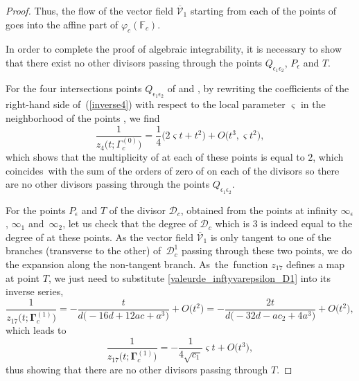 \documentclass[pdftex]{sigma}
\numberwithin{equation}{section}
\begin{document}
\begin{proof}
 Thus, the flow of the vector field $\overline{\mathcal{V}}_1$
 starting from each of the points of  goes into the affine part of $\varphi_c(\mathbb{ F}_c)$.

 In order to complete the proof of algebraic integrability, it is necessary to show that there exist no other divisors passing through the points $Q_{\epsilon_1\epsilon_2}$, $P_{\epsilon}$ and $T$.

 For the four intersections points $Q_{\epsilon_1\epsilon_2}$ of  and
 , by rewriting the coefficients of the right-hand side of~(\ref{inverse4}) with respect to the local parameter $\varsigma$ in the neighborhood of the points , we find
 \[
 \frac{1}{z_4\bigl(t;\Gamma^{(0)}_c\bigr)}=\frac{1}{4}\bigl(2\varsigma t+t^ 2\bigr)+O\bigl(t^3,\varsigma t^2\bigr),
 \]
 which shows that the multiplicity of  at each of these points is equal to $2$, which coincides~with the sum of the orders of zero of  on each of the divisors so there are no other divisors passing through the points $Q_{\epsilon_1\epsilon_2}$.

 For the points $P_{\epsilon}$ and $T$ of the divisor $\mathcal{D}_c$, obtained from the points at infinity $\infty_{\epsilon}$, $\infty_{1}$ and~$\infty_{2}$, let us check that the degree of $\mathcal{D}_c$ which is $3$ is indeed equal to the degree of  at these points. As the vector field $\overline{\mathcal{V}}_1$ is only tangent to one of the branches (transverse to the other) of~$\mathcal{D}_c^{1}$ passing through these two points, we do the expansion along the non-tangent branch. As~the~function $z_{17}$ defines a map at point $T$, we just need to substitute \eqref{valeurde_inftyvarepsilon_D1}
 into its inverse series,
 \[
 \frac{1}{z_{17}\bigl(t;\mathbf{\Gamma}_c^{(1)}\bigr)}=-\frac{t}{d\bigl(-16d+12ac+a^3\bigr)}+ O\bigl(t^2\bigr)=-\frac{2t}{d\bigl(-32d-ac_2+4a^3\bigr)}+ O\bigl(t^2\bigr),
 \]
 which leads to
 \[
 \frac{1}{z_{17}\bigl(t;\mathbf{\Gamma}_c^{(1)}\bigr)}=-\frac{1}{ 4\sqrt{c_1}}\varsigma t+ O\bigl(t^3\bigr),
 \]
 thus showing that there are no other divisors passing through $T$.


\end{proof}
\end{document}
